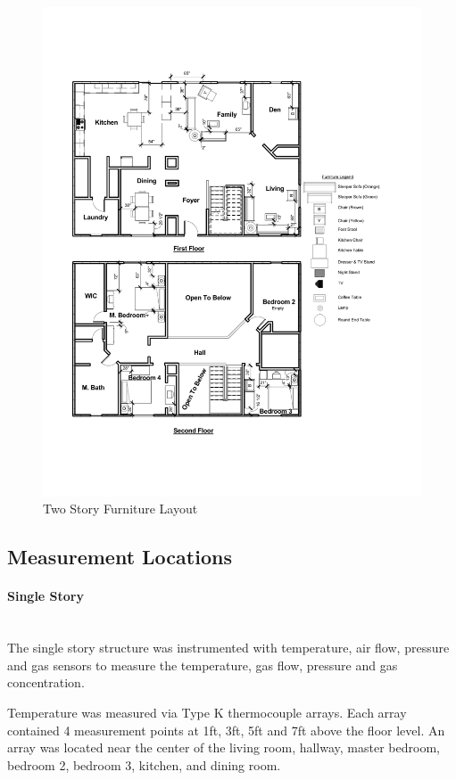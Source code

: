 \documentclass{article}
\begin{document}
\begin{figure}[H]
	\centering
	\includegraphics[width=\textwidth]{0_Images/Furniture/Two_Story_Furniture_Layout.pdf}
	\caption{Two Story Furniture Layout}
	\label{fig:TwoStoryFurniture}
\end{figure}

\subsection{Measurement Locations}

\paragraph{Single Story} \mbox{}\\
The single story structure was instrumented with temperature, air flow, pressure and gas sensors to measure the temperature, gas flow, pressure and gas concentration. 

Temperature was measured via Type K thermocouple arrays. Each array contained 4 measurement points at 1ft, 3ft, 5ft and 7ft above the floor level. An array was located near the center of the living room, hallway, master bedroom, bedroom 2, bedroom 3, kitchen, and dining room.    
\end{document}
